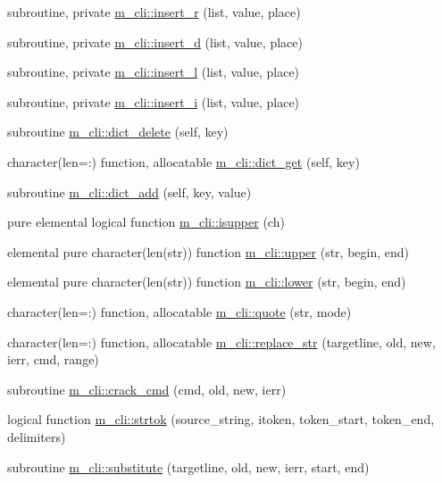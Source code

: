\begin{DoxyCompactItemize}
\item 
subroutine, private \mbox{\hyperlink{namespacem__cli_a4bfb90e14824f94017b1d4fcb39f0701}{m\+\_\+cli\+::insert\+\_\+r}} (list, value, place)
\item 
subroutine, private \mbox{\hyperlink{namespacem__cli_a030e31579a7968aea68d80db1e36ebfd}{m\+\_\+cli\+::insert\+\_\+d}} (list, value, place)
\item 
subroutine, private \mbox{\hyperlink{namespacem__cli_a0c1b22c46470afbb4ee5c67180335578}{m\+\_\+cli\+::insert\+\_\+l}} (list, value, place)
\item 
subroutine, private \mbox{\hyperlink{namespacem__cli_a841685591ef1f1827fc1fe32a7f546f1}{m\+\_\+cli\+::insert\+\_\+i}} (list, value, place)
\item 
subroutine \mbox{\hyperlink{namespacem__cli_aff32e44070983c7fb4eb0a3b1dea7a6d}{m\+\_\+cli\+::dict\+\_\+delete}} (self, key)
\item 
character(len=\+:) function, allocatable \mbox{\hyperlink{namespacem__cli_ac4a889309ffc333af6bf8e11f1fc4869}{m\+\_\+cli\+::dict\+\_\+get}} (self, key)
\item 
subroutine \mbox{\hyperlink{namespacem__cli_a1be098e2b920e8d50ed14be03a3133db}{m\+\_\+cli\+::dict\+\_\+add}} (self, key, value)
\item 
pure elemental logical function \mbox{\hyperlink{namespacem__cli_a4c126288dc18289b2095a0882f10ca77}{m\+\_\+cli\+::isupper}} (ch)
\item 
elemental pure character(len(str)) function \mbox{\hyperlink{namespacem__cli_aef6f54c9cb37251dfd664c0845186a40}{m\+\_\+cli\+::upper}} (str, begin, end)
\item 
elemental pure character(len(str)) function \mbox{\hyperlink{namespacem__cli_a685574282a09c3f57e0c18654a3a642c}{m\+\_\+cli\+::lower}} (str, begin, end)
\item 
character(len=\+:) function, allocatable \mbox{\hyperlink{namespacem__cli_ac82fec2a5441020701fe3c64af3d9948}{m\+\_\+cli\+::quote}} (str, mode)
\item 
character(len=\+:) function, allocatable \mbox{\hyperlink{namespacem__cli_a40e02b1c9fc580ddd410bb24017fab8c}{m\+\_\+cli\+::replace\+\_\+str}} (targetline, old, new, ierr, cmd, range)
\item 
subroutine \mbox{\hyperlink{namespacem__cli_a8d5d1954aac6494e07fb11f12f635c85}{m\+\_\+cli\+::crack\+\_\+cmd}} (cmd, old, new, ierr)
\item 
logical function \mbox{\hyperlink{namespacem__cli_a0015c38f9fa45a58ba6ae89f2ddb54f1}{m\+\_\+cli\+::strtok}} (source\+\_\+string, itoken, token\+\_\+start, token\+\_\+end, delimiters)
\item 
subroutine \mbox{\hyperlink{namespacem__cli_a3b66fe9cee0e084068051636afb2957d}{m\+\_\+cli\+::substitute}} (targetline, old, new, ierr, start, end)
\end{DoxyCompactItemize}
